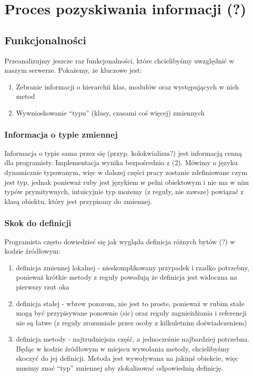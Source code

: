\documentclass[declaration,shortabstract]{iithesis}
\begin{document}
\section{Proces pozyskiwania informacji (?)}

\subsection{Funkcjonalności}

Przeanalizujmy jeszcze raz funkcjonalności, które chcielibyśmy uwzględnić w naszym serwerze. Pokażemy, że kluczowe jest:
\begin{enumerate}
\item Zebranie informacji o hierarchii klas, modułów oraz występujących w nich metod
\item Wywnioskowanie ``typu'' (klasy, czasami coś więcej) zmiennych
\end{enumerate}

\subsubsection{Informacja o typie zmiennej}

Informacja o typie sama przez się (przyp. kolokwializm?) jest informacją cenną dla programisty.
Implementacja wynika bezpośrednio z (2).
Mówimy o języku dynamicznie typowanym, więc w dalszej części pracy zostanie zdefiniowane czym jest typ, jednak ponieważ ruby jest językiem w pełni obiektowym i nie ma w nim typów prymitywnych, intuicyjnie typ możemy (z reguły, nie zawsze) powiązać z klasą obiektu, który jest przypisany do zmiennej.

\subsubsection{Skok do definicji}

Programista często dowiedzieć się jak wygląda definicja różnych bytów (?) w kodzie źródłowym:
\begin{enumerate}
\item definicja zmiennej lokalnej - nieskomplikowany przypadek i rzadko potrzebny, ponieważ krótkie metody z reguły powodują że definicja jest widoczna na pierwszy rzut oka
\item definicja stałej - wbrew pozorom, nie jest to proste, ponieważ w rubim stałe mogą być przypisywane ponownie (sic) oraz reguły zagnieżdżania i referencji nie są łatwe (z reguły zrozumiałe przez osoby z kilkuletnim doświadczeniem)
\item definicja metody - najtrudniejsza część, a jednocześnie najbardziej potrzebna. Będąc w kodzie źródłowym w miejscu wywołania metody, chcielibyśmy skoczyć do jej definicji. Metoda jest wywoływana na jakimś obiekcie, więc musimy znać ``typ'' zmiennej aby zlokalizować odpowiednią definicję.
\end{enumerate}
\end{document}
